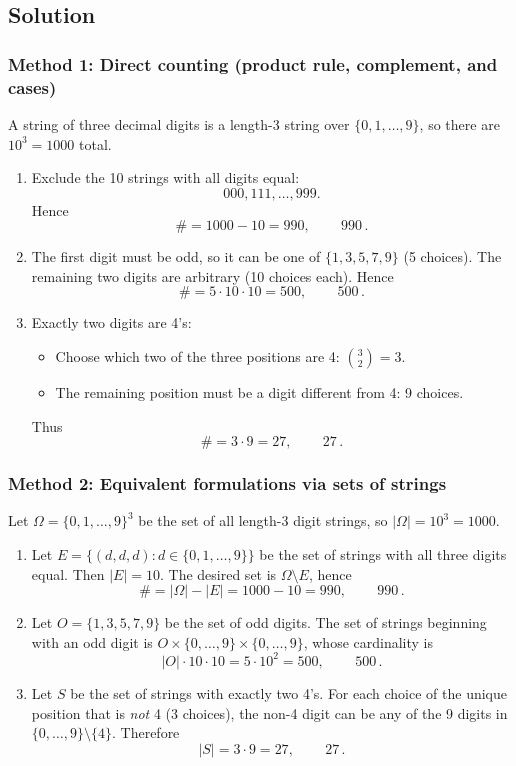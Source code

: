\documentclass[12pt]{article}
\begin{document}
\subsection{Solution}

\subsubsection{Method 1: Direct counting (product rule, complement, and cases)}
A string of three decimal digits is a length-3 string over $\{0,1,\dots,9\}$, so there are $10^3=1000$ total.

\begin{enumerate}[label=(\alph*)]
\item Exclude the 10 strings with all digits equal:
\[
000,111,\dots,999.
\]
Hence
\[
\#=1000-10=990,
\qquad
\boxed{\,990\,}.
\]

\item The first digit must be odd, so it can be one of $\{1,3,5,7,9\}$ (5 choices). The remaining two digits are arbitrary (10 choices each). Hence
\[
\# = 5\cdot 10\cdot 10 = 500,
\qquad
\boxed{\,500\,}.
\]

\item Exactly two digits are 4's:
\begin{itemize}[leftmargin=*]
\item Choose which two of the three positions are 4: $\binom{3}{2}=3$.
\item The remaining position must be a digit different from 4: 9 choices.
\end{itemize}
Thus
\[
\# = 3\cdot 9 = 27,
\qquad
\boxed{\,27\,}.
\]
\end{enumerate}

\subsubsection{Method 2: Equivalent formulations via sets of strings}
Let $\Omega=\{0,1,\dots,9\}^3$ be the set of all length-3 digit strings, so $|\Omega|=10^3=1000$.

\begin{enumerate}[label=(\alph*)]
\item Let $E=\{(d,d,d): d\in\{0,1,\dots,9\}\}$ be the set of strings with all three digits equal. Then $|E|=10$.
The desired set is $\Omega\setminus E$, hence
\[
\# = |\Omega|-|E| = 1000-10 = 990,
\qquad
\boxed{\,990\,}.
\]

\item Let $O=\{1,3,5,7,9\}$ be the set of odd digits. The set of strings beginning with an odd digit is $O\times \{0,\dots,9\}\times \{0,\dots,9\}$, whose cardinality is
\[
|O|\cdot 10\cdot 10 = 5\cdot 10^2 = 500,
\qquad
\boxed{\,500\,}.
\]

\item Let $S$ be the set of strings with exactly two 4's. For each choice of the unique position that is \emph{not} 4 (3 choices), the non-4 digit can be any of the 9 digits in $\{0,\dots,9\}\setminus\{4\}$. Therefore
\[
|S| = 3\cdot 9 = 27,
\qquad
\boxed{\,27\,}.
\]
\end{enumerate}
\end{document}
